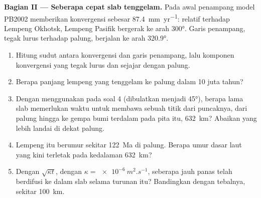 \begin{problem}
\medskip
\noindent\textbf{Bagian II --- Seberapa cepat slab tenggelam.} Pada awal penampang model
PB2002 memberikan konvergensi sebesar \qty{87.4}{mm.yr^{-1}}: relatif terhadap Lempeng
Okhotsk, Lempeng Pasifik bergerak ke arah  \ang{300}. Garis penampang, tegak lurus
terhadap palung, berjalan ke arah  \ang{320.9}.
\begin{enumerate}[resume]
  \item Hitung sudut antara konvergensi dan garis penampang, lalu komponen konvergensi yang
        tegak lurus dan sejajar dengan palung.
  \item Berapa panjang lempeng yang tenggelam ke palung dalam 10 juta tahun?
  \item Dengan menggunakan  pada soal 4 (dibulatkan menjadi \ang{45}), berapa lama
        slab memerlukan waktu untuk membawa sebuah titik dari puncaknya, dari palung hingga ke
        gempa bumi terdalam pada pita itu, \qty{632}{km}? Abaikan  yang lebih landai di
        dekat palung.
  \item Lempeng itu berumur sekitar \qty{122}{Ma} di palung. Berapa umur dasar laut yang kini
        terletak pada kedalaman \qty{632}{km}?
  \item Dengan $\sqrt{\kappa t}$, dengan $\kappa = \qty{e-6}{m^2.s^{-1}}$, seberapa jauh panas
        telah berdifusi ke dalam slab selama turunan itu? Bandingkan dengan tebalnya, sekitar
        \qty{100}{km}.
\end{enumerate}


\end{problem}
